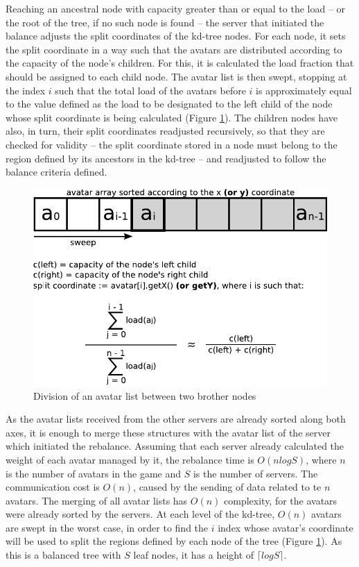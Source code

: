 \documentclass[acmjacm]{acmtrans2m}
\begin{document}
Reaching an ancestral node with capacity greater than or equal to the load -- or the root of the tree, if no such node is found -- the server that initiated the balance adjusts the split coordinates of the kd-tree nodes. For each node, it sets the split coordinate in a way such that the avatars are distributed according to the capacity of the node's children. For this, it is calculated the load fraction that should be assigned to each child node. The avatar list is then swept, stopping at the index $i$ such that the total load of the avatars before $i$ is approximately equal to the value defined as the load to be designated to the left child of the node whose split coordinate is being calculated (Figure \ref{fig:balancenode}). The children nodes have also, in turn, their split coordinates readjusted recursively, so that they are checked for validity -- the split coordinate stored in a node must belong to the region defined by its ancestors in the kd-tree -- and readjusted to follow the balance criteria defined.

\begin{figure}
  \centering
  \includegraphics[width=0.8\linewidth]{images/balancenode}
  \caption{Division of an avatar list between two brother nodes}
   \label{fig:balancenode}
\end{figure}

As the avatar lists received from the other servers are already sorted along both axes, it is enough to merge these structures with the avatar list of the server which initiated the rebalance. Assuming that each server already calculated the weight of each avatar managed by it, the rebalance time is  $O(nlogS)$, where $n$ is the number of avatars in the game and $S$ is the number of servers. The communication cost is $O(n)$, caused by the sending of data related to te $n$ avatars. The merging of all avatar lists has $O(n)$ complexity, for the avatars were already sorted by the servers. At each level of the kd-tree, $O(n)$ avatars are swept in the worst case, in order to find the $i$ index whose avatar's coordinate will be used to split the regions defined by each node of the tree (Figure \ref{fig:balancenode}). As this is a balanced tree with $S$ leaf nodes, it has a height of $\lceil logS \rceil$.
\end{document}
